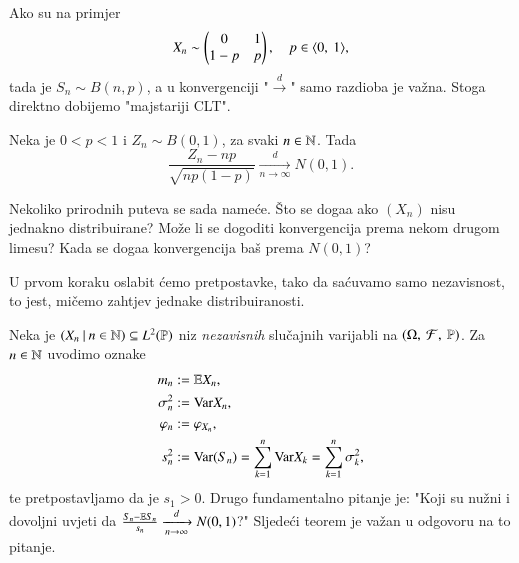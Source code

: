 Ako su na primjer
\begin{equation*}
    X_n \sim
    \begin{pmatrix}
        0 & 1\\
        1 - p & p
    \end{pmatrix},
    \quad p \in \langle {0}, \: {1} \rangle,
\end{equation*}
tada je $S_n \sim B (n, p)$, a u konvergenciji "$\xrightarrow{d}$" samo razdioba je va\v zna.
Stoga direktno dobijemo "majstariji CLT".

\begin{kor}  \label{kor:19.2}
    Neka je $0 < p < 1$ i $Z_n \sim B (0, 1)$, za svaki $n \in \mathbb{N}$.
    Tada
    \begin{equation*}
        \frac{Z_n - n p}{\sqrt{n p (1 - p)}} \xrightarrow[n \to \infty]{d} N (0, 1).
    \end{equation*}
\end{kor}

\begin{nap} \label{nap:19.3}
    Nekoliko prirodnih puteva se sada name\' ce.
    \v Sto se doga\dj a ako $(X_n)$ nisu jednakno distribuirane?
    Mo\v ze li se dogoditi konvergencija prema nekom drugom limesu?
    Kada se doga\dj a konvergencija ba\v s prema $N(0, 1)$?
\end{nap}

U prvom koraku oslabit \' cemo pretpostavke, tako da sa\' cuvamo samo nezavisnost, to jest, mi\v cemo zahtjev jednake distribuiranosti.

Neka je $({X_n} \: | \: {n \in \mathbb{N}}) \subseteq L^2 (\mathbb{P})$ niz \emph{nezavisnih} slu\v cajnih varijabli na $(\Omega, \: \mathcal{F}, \: \mathbb{P})$.
Za $n \in \mathbb{N}$ uvodimo oznake
\begin{equation*}
    \begin{aligned}
        m_n &:= \mathbb{E} X_n,\\
        \sigma^2_n &:= \mathrm{Var} X_n,\\
        \varphi_n &:= \varphi_{X_n},\\
        s^2_n &:= \mathrm{Var} (S_n) = \sum\limits_{k = 1}^{n} \mathrm{Var} X_k = \sum\limits_{k = 1}^{n} \sigma^2_k,
    \end{aligned}
\end{equation*}
te pretpostavljamo da je $s_1 > 0$.
Drugo fundamentalno pitanje je: "Koji su nu\v zni i dovoljni uvjeti
da $\frac{S_n - \mathbb{E} S_n}{s_n} \xrightarrow[n \to \infty]{d} N(0, 1)$?"
Sljede\' ci teorem je va\v zan u odgovoru na to pitanje.

